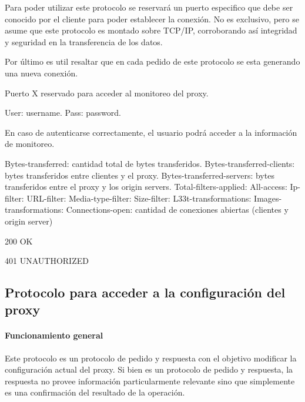 \documentclass[a4paper,10pt]{article}
\begin{document}
        Para poder utilizar este protocolo se reservar\'a un puerto especifico que debe ser conocido 
        por el cliente para poder establecer la conexi\'on. No es exclusivo, pero se asume que este 
        protocolo es montado sobre TCP/IP, corroborando as\'i integridad y seguridad en la transferencia 
        de los datos.

        Por \'ultimo es util resaltar que en cada pedido de este protocolo se esta generando una nueva 
        conexi\'on.

        Puerto X reservado para acceder al monitoreo del proxy.

        User: username.
        Pass: password.

        En caso de autenticarse correctamente, el usuario podr\'a acceder a la información de monitoreo.

        Bytes-transferred: cantidad total de bytes transferidos.
        Bytes-transferred-clients: bytes transferidos entre clientes y el proxy.
        Bytes-transferred-servers: bytes transferidos entre el proxy y los origin servers.
        Total-filters-applied:
        All-access:
        Ip-filter:
        URL-filter:
        Media-type-filter:
        Size-filter:
        L33t-transformations:
        Images-transformations:
        Connections-open: cantidad de conexiones abiertas (clientes y origin server)


        200 OK

        401 UNAUTHORIZED

\newpage
    \subsection{Protocolo para acceder a la configuración del proxy}

        \paragraph*{Funcionamiento general}

        Este protocolo es un protocolo de pedido y respuesta con el objetivo modificar la 
        configuraci\'on actual del proxy. Si bien es un protocolo de pedido y respuesta, la 
        respuesta no provee informaci\'on particularmente relevante sino que simplemente es 
        una confirmaci\'on del resultado de la operaci\'on. 
\end{document}
